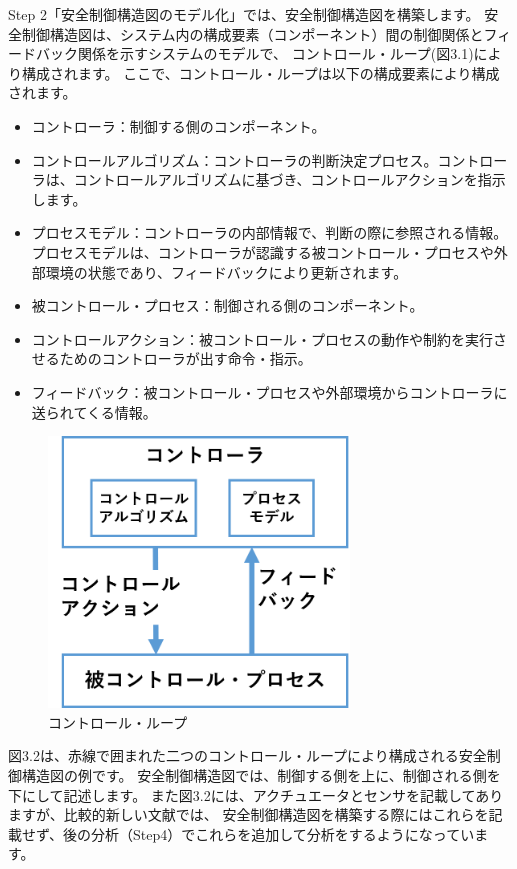 Step 2「安全制御構造図のモデル化」では、安全制御構造図を構築します。
安全制御構造図は、システム内の構成要素（コンポーネント）間の制御関係とフィードバック関係を示すシステムのモデルで、
コントロール・ループ(図3.1)により構成されます。
ここで、コントロール・ループは以下の構成要素により構成されます。
%
\begin{itemize}
    \item コントローラ：制御する側のコンポーネント。
    \item コントロールアルゴリズム：コントローラの判断決定プロセス。コントローラは、コントロールアルゴリズムに基づき、コントロールアクションを指示します。
    \item プロセスモデル：コントローラの内部情報で、判断の際に参照される情報。プロセスモデルは、コントローラが認識する被コントロール・プロセスや外部環境の状態であり、フィードバックにより更新されます。
    \item 被コントロール・プロセス：制御される側のコンポーネント。
    \item コントロールアクション：被コントロール・プロセスの動作や制約を実行させるためのコントローラが出す命令・指示。
    \item フィードバック：被コントロール・プロセスや外部環境からコントローラに送られてくる情報。
\end{itemize}
%
\begin{figure}[H]
    \centering
    \includegraphics[width=80mm]{safety_assurance_contents/ch3images/fig-3-2-3-01.png}
    \caption{コントロール・ループ}
\end{figure}

図3.2は、赤線で囲まれた二つのコントロール・ループにより構成される安全制御構造図の例です。
安全制御構造図では、制御する側を上に、制御される側を下にして記述します。
また図3.2には、アクチュエータとセンサを記載してありますが、比較的新しい文献では、
安全制御構造図を構築する際にはこれらを記載せず、後の分析（Step4）でこれらを追加して分析をするようになっています。

